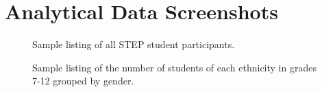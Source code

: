\chapter{Analytical Data Screenshots}
\label{chap:analytical-appendix}

\begin{figure}[h!]
	\centering
	\caption{Sample listing of all STEP student participants.}
	\label{fig:screens-analytics-participants}
\end{figure}

\begin{figure}[h!]
	\centering
	\caption{Sample listing of the number of students of each ethnicity in grades 7-12 grouped by gender.}
	\label{fig:screens-analytics-students}
\end{figure}

